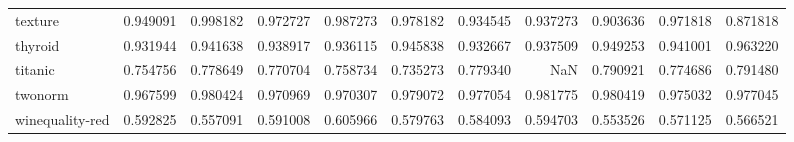 \begin{tabular}{lrrrrrrrrrr}
texture         &   0.949091 &  0.998182 &  0.972727 &  0.987273 &  0.978182 &  0.934545 &  0.937273 &  0.903636 &  0.971818 &  0.871818 \\
thyroid         &   0.931944 &  0.941638 &  0.938917 &  0.936115 &  0.945838 &  0.932667 &  0.937509 &  0.949253 &  0.941001 &  0.963220 \\
titanic         &   0.754756 &  0.778649 &  0.770704 &  0.758734 &  0.735273 &  0.779340 &       NaN &  0.790921 &  0.774686 &  0.791480 \\
twonorm         &   0.967599 &  0.980424 &  0.970969 &  0.970307 &  0.979072 &  0.977054 &  0.981775 &  0.980419 &  0.975032 &  0.977045 \\
winequality-red &   0.592825 &  0.557091 &  0.591008 &  0.605966 &  0.579763 &  0.584093 &  0.594703 &  0.553526 &  0.571125 &  0.566521 \\
\bottomrule
\end{tabular}
